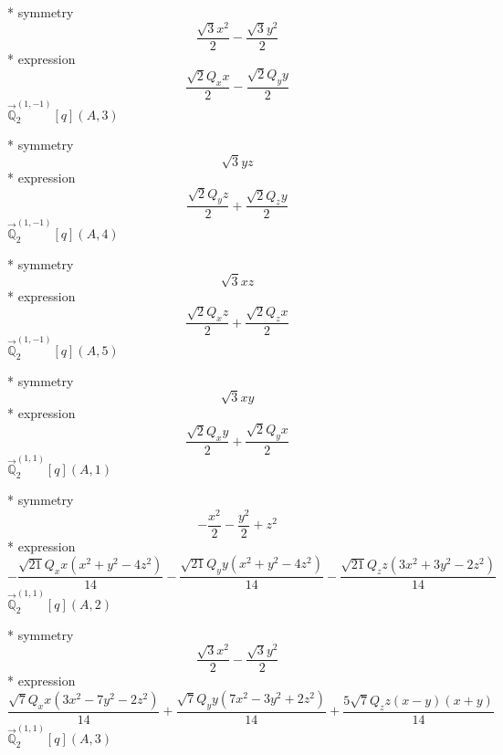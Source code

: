 \documentclass[fleqn,8pt]{jsarticle}
\begin{document}
\noindent\quad ** symmetry
\begin{dmath*}
\frac{\sqrt{3} x^{2}}{2} - \frac{\sqrt{3} y^{2}}{2}
\end{dmath*}
\noindent\quad ** expression
\begin{dmath*}
\frac{\sqrt{2} Q_{x} x}{2} - \frac{\sqrt{2} Q_{y} y}{2}
\end{dmath*}
\noindent\quad $\vec{\mathbb{Q}}_{2}^{(1,-1)}[q](A,3)$

\noindent\quad ** symmetry
\begin{dmath*}
\sqrt{3} y z
\end{dmath*}
\noindent\quad ** expression
\begin{dmath*}
\frac{\sqrt{2} Q_{y} z}{2} + \frac{\sqrt{2} Q_{z} y}{2}
\end{dmath*}
\noindent\quad $\vec{\mathbb{Q}}_{2}^{(1,-1)}[q](A,4)$

\noindent\quad ** symmetry
\begin{dmath*}
\sqrt{3} x z
\end{dmath*}
\noindent\quad ** expression
\begin{dmath*}
\frac{\sqrt{2} Q_{x} z}{2} + \frac{\sqrt{2} Q_{z} x}{2}
\end{dmath*}
\noindent\quad $\vec{\mathbb{Q}}_{2}^{(1,-1)}[q](A,5)$

\noindent\quad ** symmetry
\begin{dmath*}
\sqrt{3} x y
\end{dmath*}
\noindent\quad ** expression
\begin{dmath*}
\frac{\sqrt{2} Q_{x} y}{2} + \frac{\sqrt{2} Q_{y} x}{2}
\end{dmath*}
\noindent\quad $\vec{\mathbb{Q}}_{2}^{(1,1)}[q](A,1)$

\noindent\quad ** symmetry
\begin{dmath*}
- \frac{x^{2}}{2} - \frac{y^{2}}{2} + z^{2}
\end{dmath*}
\noindent\quad ** expression
\begin{dmath*}
- \frac{\sqrt{21} Q_{x} x \left(x^{2} + y^{2} - 4 z^{2}\right)}{14} - \frac{\sqrt{21} Q_{y} y \left(x^{2} + y^{2} - 4 z^{2}\right)}{14} - \frac{\sqrt{21} Q_{z} z \left(3 x^{2} + 3 y^{2} - 2 z^{2}\right)}{14}
\end{dmath*}
\noindent\quad $\vec{\mathbb{Q}}_{2}^{(1,1)}[q](A,2)$

\noindent\quad ** symmetry
\begin{dmath*}
\frac{\sqrt{3} x^{2}}{2} - \frac{\sqrt{3} y^{2}}{2}
\end{dmath*}
\noindent\quad ** expression
\begin{dmath*}
\frac{\sqrt{7} Q_{x} x \left(3 x^{2} - 7 y^{2} - 2 z^{2}\right)}{14} + \frac{\sqrt{7} Q_{y} y \left(7 x^{2} - 3 y^{2} + 2 z^{2}\right)}{14} + \frac{5 \sqrt{7} Q_{z} z \left(x - y\right) \left(x + y\right)}{14}
\end{dmath*}
\noindent\quad $\vec{\mathbb{Q}}_{2}^{(1,1)}[q](A,3)$
\end{document}
